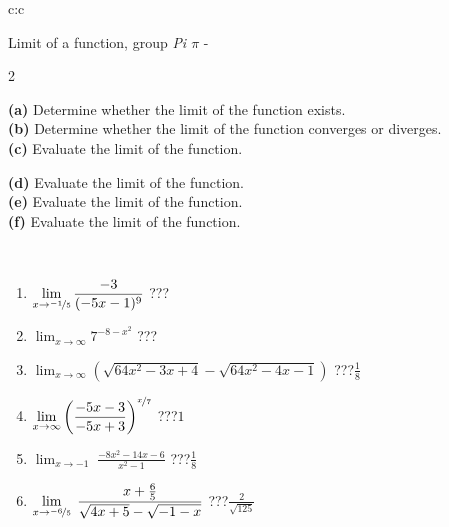 \documentclass[10pt]{report}
\begin{document}
\newpage
\thispagestyle{empty}
\begin{tabular}{c:c}
\begin{minipage}[c][104.5mm][t]{0.5\linewidth}
\begin{center}
\vspace{5mm}
{\huge Limit of a function, group \textit{Pi $\pi$} -}\\[5mm]
\begin{minipage}{0.95\linewidth}
\begin{center}
{\small \begin{multicols}{2} \raggedright
\textbf{(a)} Determine whether the limit of the function exists. \\[1mm]
\textbf{(b)} Determine whether the limit of the function converges or diverges. \\[1mm]
\textbf{(c)} Evaluate the limit of the function. \par \columnbreak
\textbf{(d)} Evaluate the limit of the function. \\[1mm]
\textbf{(e)} Evaluate the limit of the function. \\[1mm]
\textbf{(f)} Evaluate the limit of the function. \\[1mm]
\end{multicols}
}
\end{center}
\end{minipage}
\\[1mm]
\begin{minipage}{0.79\linewidth}
\begin{center}
\begin{varwidth}{\linewidth}
\setlength{\itemsep}{0pt}
\begin{enumerate}
\normalsize
\item $\displaystyle\lim_{x\to\nicefrac{-1}{5}}{\frac{-3}{(-5x-1)^{9}}}$\quad \dotfill\; ???\;\dotfill \quad {}
\item $\displaystyle\lim_{x\to\infty}{7^{-8-x^2}}$\quad \dotfill\; ???\;\dotfill \quad {}
\item $\displaystyle\lim_{x\to\infty}{\left(\sqrt{64x^2-3x+4} - \sqrt{64x^2-4x-1}\right)}$\quad \dotfill\; ???\;\dotfill \quad $\frac{1}{8}$
\item $\displaystyle\lim_{x\to\infty}{\left( \frac{-5x-3}{-5x+3} \right)^{\nicefrac{x}{7}}}$\quad \dotfill\; ???\;\dotfill \quad $1$
\item $\displaystyle\lim_{x\to -1}{\;\frac{-8x^2-14x-6}{x^2-1}}$\quad \dotfill\; ???\;\dotfill \quad $\frac{1}{8}$
\item $\displaystyle\lim_{x\to \nicefrac{-6}{5}}{\;\frac{x+\frac{6}{5}}{\sqrt{4x+5} - \sqrt{-1-x}}}$\quad \dotfill\; ???\;\dotfill \quad $\frac{2}{\sqrt{125}}$

\end{enumerate}
\end{varwidth}
\end{center}
\end{minipage}
\end{center}
\end{minipage}
\end{tabular}
\end{document}
